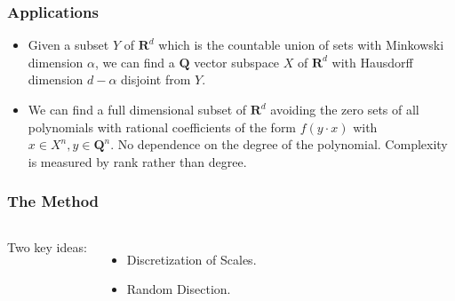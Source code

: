 \documentclass[handout,usenames,dvipsnames]{beamer}
\begin{document}
\begin{frame}
    \frametitle{Applications}

    \begin{itemize}
        \item Given a subset $Y$ of $\mathbf{R}^d$ which is the countable union of sets with Minkowski dimension $\alpha$, we can find a $\mathbf{Q}$ vector subspace $X$ of $\mathbf{R}^d$ with Hausdorff dimension $d - \alpha$ disjoint from $Y$.

        \pause
        \item We can find a full dimensional subset of $\mathbf{R}^d$ avoiding the zero sets of all polynomials with rational coefficients of the form $f(y \cdot x)$ with $x \in X^n, y \in \mathbf{Q}^n$. No dependence on the degree of the polynomial. Complexity is measured by rank rather than degree.

    \end{itemize}
\end{frame}

\begin{frame}
    \frametitle{The Method}

    \begin{columns}


    {\Huge Two key ideas: }
    \pause

     \begin{itemize}
        \item {\Large Discretization of Scales.}
        \pause

        \item {\Large Random Disection.}
     \end{itemize}

     \end{columns}
\end{frame}

\end{document}
